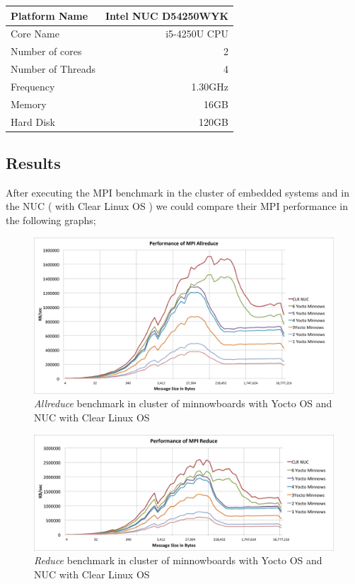     \begin{center}
    \begin{tabular}{ | l | r |}
        \hline
        Platform Name & Intel NUC D54250WYK \\ \hline
        Core Name & i5-4250U CPU  \\ \hline
        Number of cores & 2 \\ \hline
        Number of Threads & 4 \\ \hline
        Frequency & 1.30GHz \\ \hline
        Memory & 16GB\\ \hline
        Hard Disk & 120GB \\ \hline
    \end{tabular}
    \end{center}



\subsection{Results}

After executing the MPI benchmark in the cluster of embedded systems  and in
the NUC ( with Clear Linux OS ) we could compare their MPI performance in the
following graphs; 

\begin{figure}[H]
\centering
\includegraphics[width=1.0\textwidth]{images/mpbench_cluster_experiments/mpi_all_reduce.png}
\caption{\textit{Allreduce} benchmark in cluster of minnowboards with Yocto OS and NUC
with Clear Linux OS}
\label{all_reduce_cluster}
\end{figure}


\begin{figure}[H]
\centering
\includegraphics[width=1.0\textwidth]{images/mpbench_cluster_experiments/mpi_reduce.png}
\caption{\textit{Reduce} benchmark in cluster of minnowboards with Yocto OS and NUC
with Clear Linux OS}
\label{reduce_cluster}
\end{figure}


